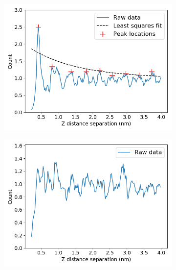 \documentclass{article}
\begin{document}
\begin{figure}
\begin{subfigure}{0.45\textwidth}
  \centering
  \includegraphics[width=\textwidth]{z_correlation_sandwich_disordered.png}
  \caption{}\label{fig:z_correlation_sandwich_disordered}
  \end{subfigure}  
  \begin{subfigure}{0.45\textwidth}
  \centering
  \includegraphics[width=\textwidth]{z_correlation_offset_disordered.png}
  \caption{}\label{fig:z_correlation_offset_disordered}
  \end{subfigure}  
  \caption{}\label{fig:correlation}
  \end{figure}
  
\end{document}
